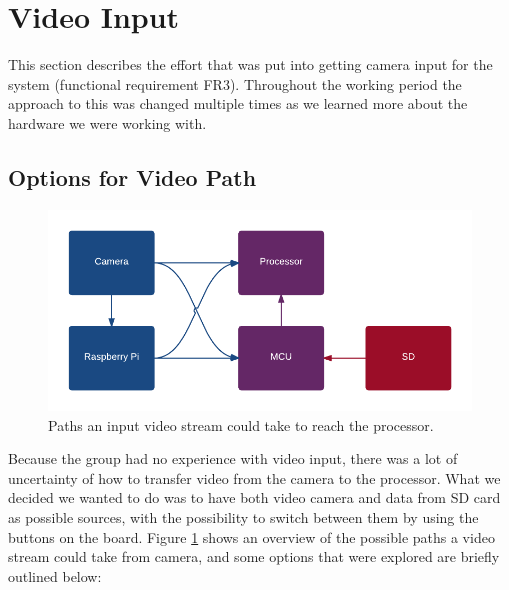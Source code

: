\section{Video Input}
This section describes the effort that was put into getting camera input for the system (functional requirement FR3).
Throughout the working period the approach to this was changed multiple times as we learned more about the hardware we were working with.




\subsection{Options for Video Path}
\begin{figure}
    \centering
    \includegraphics[width=\linewidth]{img/VideoPath}
    \caption{Paths an input video stream could take to reach the processor.}
    \label{fig:VideoPath}
\end{figure}

Because the group had no experience with video input,
there was a lot of uncertainty of how to transfer video from the camera to the processor.
What we decided we wanted to do was to have both video camera and data from SD card as possible sources,
with the possibility to switch between them by using the buttons on the board.
Figure \ref{fig:VideoPath} shows an overview of the possible paths a video stream could take from camera,
and some options that were explored are briefly outlined below:

